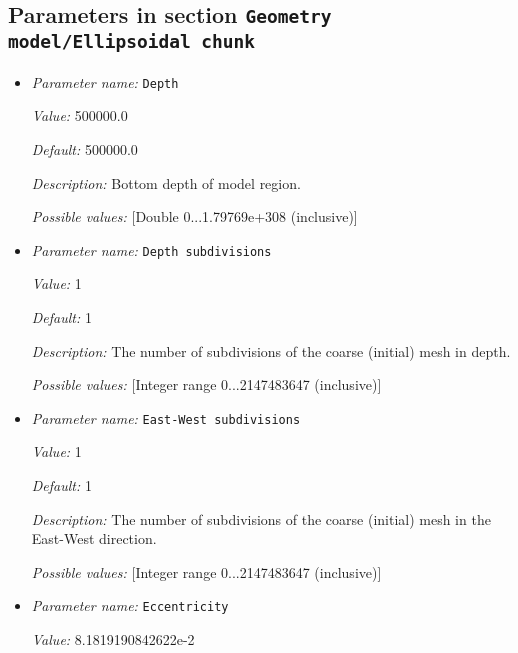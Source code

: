 \subsection{Parameters in section \tt Geometry model/Ellipsoidal chunk}
\label{parameters:Geometry_20model/Ellipsoidal_20chunk}

\begin{itemize}
\item {\it Parameter name:} {\tt Depth}
\label{parameters:Geometry model/Ellipsoidal chunk/Depth}


{\it Value:} 500000.0


{\it Default:} 500000.0


{\it Description:} Bottom depth of model region.


{\it Possible values:} [Double 0...1.79769e+308 (inclusive)]
\item {\it Parameter name:} {\tt Depth subdivisions}
\label{parameters:Geometry model/Ellipsoidal chunk/Depth subdivisions}


{\it Value:} 1


{\it Default:} 1


{\it Description:} The number of subdivisions of the coarse (initial) mesh in depth.


{\it Possible values:} [Integer range 0...2147483647 (inclusive)]
\item {\it Parameter name:} {\tt East-West subdivisions}
\label{parameters:Geometry model/Ellipsoidal chunk/East-West subdivisions}


{\it Value:} 1


{\it Default:} 1


{\it Description:} The number of subdivisions of the coarse (initial) mesh in the East-West direction.


{\it Possible values:} [Integer range 0...2147483647 (inclusive)]
\item {\it Parameter name:} {\tt Eccentricity}
\label{parameters:Geometry model/Ellipsoidal chunk/Eccentricity}


{\it Value:} 8.1819190842622e-2



\end{itemize}

